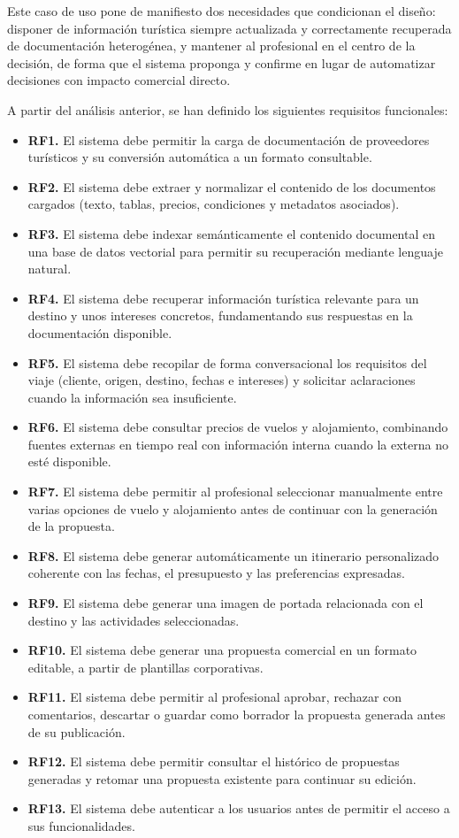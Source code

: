 Este caso de uso pone de manifiesto dos necesidades que condicionan el diseño: disponer de información turística siempre actualizada y correctamente recuperada de documentación heterogénea, y mantener al profesional en el centro de la decisión, de forma que el sistema proponga y confirme en lugar de automatizar decisiones con impacto comercial directo.

A partir del análisis anterior, se han definido los siguientes requisitos funcionales:

\begin{itemize}
\item \textbf{RF1.} El sistema debe permitir la carga de documentación de proveedores turísticos y su conversión automática a un formato consultable.
\item \textbf{RF2.} El sistema debe extraer y normalizar el contenido de los documentos cargados (texto, tablas, precios, condiciones y metadatos asociados).
\item \textbf{RF3.} El sistema debe indexar semánticamente el contenido documental en una base de datos vectorial para permitir su recuperación mediante lenguaje natural.
\item \textbf{RF4.} El sistema debe recuperar información turística relevante para un destino y unos intereses concretos, fundamentando sus respuestas en la documentación disponible.
\item \textbf{RF5.} El sistema debe recopilar de forma conversacional los requisitos del viaje (cliente, origen, destino, fechas e intereses) y solicitar aclaraciones cuando la información sea insuficiente.
\item \textbf{RF6.} El sistema debe consultar precios de vuelos y alojamiento, combinando fuentes externas en tiempo real con información interna cuando la externa no esté disponible.
\item \textbf{RF7.} El sistema debe permitir al profesional seleccionar manualmente entre varias opciones de vuelo y alojamiento antes de continuar con la generación de la propuesta.
\item \textbf{RF8.} El sistema debe generar automáticamente un itinerario personalizado coherente con las fechas, el presupuesto y las preferencias expresadas.
\item \textbf{RF9.} El sistema debe generar una imagen de portada relacionada con el destino y las actividades seleccionadas.
\item \textbf{RF10.} El sistema debe generar una propuesta comercial en un formato editable, a partir de plantillas corporativas.
\item \textbf{RF11.} El sistema debe permitir al profesional aprobar, rechazar con comentarios, descartar o guardar como borrador la propuesta generada antes de su publicación.
\item \textbf{RF12.} El sistema debe permitir consultar el histórico de propuestas generadas y retomar una propuesta existente para continuar su edición.
\item \textbf{RF13.} El sistema debe autenticar a los usuarios antes de permitir el acceso a sus funcionalidades.
\end{itemize}

